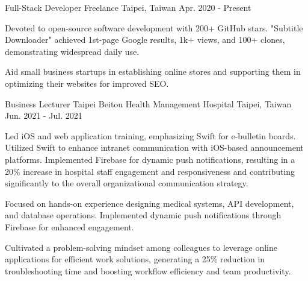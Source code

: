 

\begin{cventries}

  \cventry
    {Full-Stack Developer} %
    {Freelance} %
    {Taipei, Taiwan} %
    {Apr. 2020 - Present} %
    {
      \begin{cvitems} %
        \item {Devoted to open-source software development with 200+ GitHub stars. "Subtitle Downloader" achieved 1st-page Google results, 1k+ views, and 100+ clones, demonstrating widespread daily use.}
        \item {Aid small business startups in establishing online stores and supporting them in optimizing their websites for improved SEO.}
      \end{cvitems}
    }

  \cventry
  {Business Lecturer} %
  {Taipei Beitou Health Management Hospital} %
  {Taipei, Taiwan} %
  {Jun. 2021 - Jul. 2021} %
  {
    \begin{cvitems} %
      \item {Led iOS and web application training, emphasizing Swift for e-bulletin boards. Utilized Swift to enhance intranet communication with iOS-based announcement platforms. Implemented Firebase for dynamic push notifications, resulting in a 20\% increase in hospital staff engagement and responsiveness and contributing significantly to the overall organizational communication strategy.}
      \item {Focused on hands-on experience designing medical systems, API development, and database operations. Implemented dynamic push notifications through Firebase for enhanced engagement.}
      \item {Cultivated a problem-solving mindset among colleagues to leverage online applications for efficient work solutions, generating a 25\% reduction in troubleshooting time and boosting workflow efficiency and team productivity.}
    \end{cvitems}
  }


\end{cventries}
